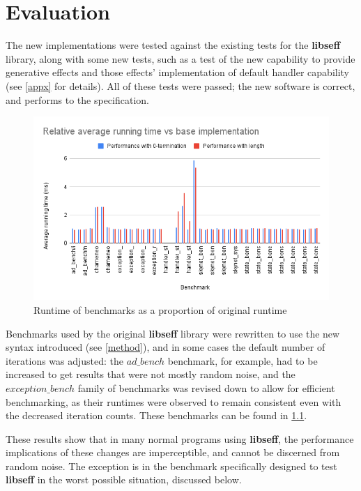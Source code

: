 \documentclass[logo,bsc,singlespacing,parskip,online]{infthesis}
\begin{document}
\chapter{Evaluation} \label{eval}

The new implementations were tested against the existing tests for the \textbf{libseff} library, along with some new tests, such as a test of the new capability to provide generative effects and those effects' implementation of default handler capability (see \cref{appx} for details). All of these tests were passed; the new software is correct, and performs to the specification.

\begin{figure}[ht]
    \centering
    \includegraphics[width=1\linewidth]{all.png}
    \caption{Runtime of benchmarks as a proportion of original runtime}
    \label{fig:many}
\end{figure}

Benchmarks used by the original \textbf{libseff} library were rewritten to use the new syntax introduced (see \cref{method}), and in some cases the default number of iterations was adjusted: the $ad\_bench$ benchmark, for example, had to be increased to get results that were not mostly random noise, and the $exception\_bench$ family of benchmarks was revised down to allow for efficient benchmarking, as their runtimes were observed to remain consistent even with the decreased iteration counts. These benchmarks can be found in \cref{fig:many}.

These results show that in many normal programs using \textbf{libseff}, the performance implications of these changes are imperceptible, and cannot be discerned from random noise. The exception is in the benchmark specifically designed to test \textbf{libseff} in the worst possible situation, discussed below.
\end{document}
